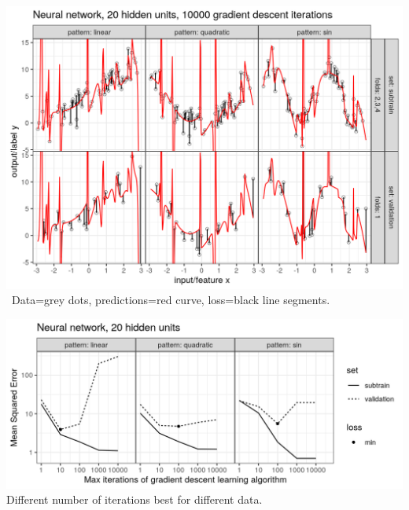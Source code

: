 \begin{frame}
  \includegraphics[width=\textwidth]{figure-overfitting-pred-units=20-maxit=10000.png}
\ Data=grey dots, predictions=red curve, loss=black line segments.

\end{frame}


\begin{frame}
  \includegraphics[width=\textwidth]{figure-overfitting-data-loss-20.png}
Different number of iterations best for different data.
\end{frame}

